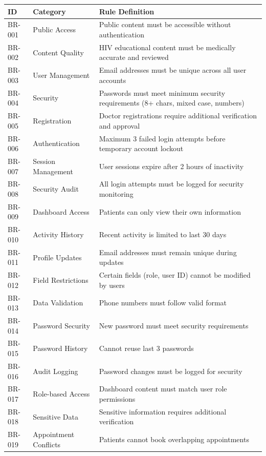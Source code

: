 \documentclass[12pt,a4paper]{article}
\begin{document}
\begin{longtable}{|p{2cm}|p{3cm}|p{9cm}|}
\hline
\textbf{ID} & \textbf{Category} & \textbf{Rule Definition} \\
\hline
BR-001 & Public Access & Public content must be accessible without authentication \\
\hline
BR-002 & Content Quality & HIV educational content must be medically accurate and reviewed \\
\hline
BR-003 & User Management & Email addresses must be unique across all user accounts \\
\hline
BR-004 & Security & Passwords must meet minimum security requirements (8+ chars, mixed case, numbers) \\
\hline
BR-005 & Registration & Doctor registrations require additional verification and approval \\
\hline
BR-006 & Authentication & Maximum 3 failed login attempts before temporary account lockout \\
\hline
BR-007 & Session Management & User sessions expire after 2 hours of inactivity \\
\hline
BR-008 & Security Audit & All login attempts must be logged for security monitoring \\
\hline
BR-009 & Dashboard Access & Patients can only view their own information \\
\hline
BR-010 & Activity History & Recent activity is limited to last 30 days \\
\hline
BR-011 & Profile Updates & Email addresses must remain unique during updates \\
\hline
BR-012 & Field Restrictions & Certain fields (role, user ID) cannot be modified by users \\
\hline
BR-013 & Data Validation & Phone numbers must follow valid format \\
\hline
BR-014 & Password Security & New password must meet security requirements \\
\hline
BR-015 & Password History & Cannot reuse last 3 passwords \\
\hline
BR-016 & Audit Logging & Password changes must be logged for security \\
\hline
BR-017 & Role-based Access & Dashboard content must match user role permissions \\
\hline
BR-018 & Sensitive Data & Sensitive information requires additional verification \\
\hline
BR-019 & Appointment Conflicts & Patients cannot book overlapping appointments \\

\end{longtable}
\end{document}
